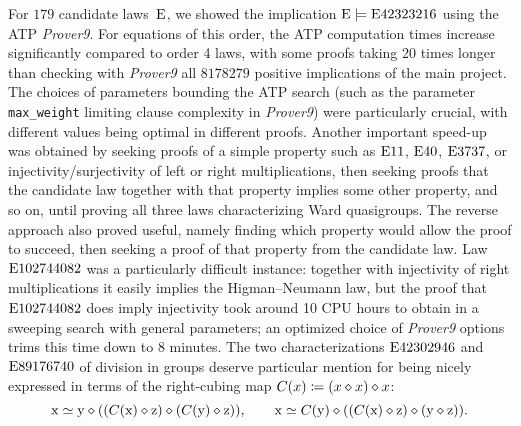 For $179$ candidate laws~$\mathrm{E}$, we showed the implication $\mathrm{E}\models\mathrm{E}42323216$ using the ATP \emph{Prover9}.  For equations of this order, the ATP computation times increase significantly compared to order 4 laws, with some proofs taking 20 times longer than checking with \emph{Prover9} all $\num{8178279}$ positive implications of the main project.  The choices of parameters bounding the ATP search (such as the parameter \texttt{max\_weight} limiting clause complexity in \emph{Prover9}) were particularly crucial, with different values being optimal in different proofs.  Another important speed-up was obtained by seeking proofs of a simple property such as $\mathrm{E}11$, $\mathrm{E}40$, $\mathrm{E}3737$, or injectivity/surjectivity of left or right multiplications, then seeking proofs that the candidate law together with that property implies some other property, and so on, until proving all three laws characterizing Ward quasigroups.  The reverse approach also proved useful, namely finding which property would allow the proof to succeed, then seeking a proof of that property from the candidate law.  Law $\mathrm{E}102744082$ was a particularly difficult instance: together with injectivity of right multiplications it easily implies the Higman--Neumann law, but the proof that $\mathrm{E}102744082$ does imply injectivity took around 10 CPU hours to obtain in a sweeping search with general parameters; an optimized choice of \emph{Prover9} options trims this time down to 8 minutes.  The two characterizations $\mathrm{E}42302946$ and~$\mathrm{E}89176740$ of division in groups deserve particular mention for being nicely expressed in terms of the right-cubing map $C(x) \coloneqq (x \diamond x) \diamond x$:
\[
  \mathrm{x} \simeq \mathrm{y} \diamond ((C(\mathrm{x}) \diamond \mathrm{z}) \diamond (C(\mathrm{y}) \diamond \mathrm{z})) , \qquad
  \mathrm{x} \simeq C(\mathrm{y}) \diamond ((C(\mathrm{x}) \diamond \mathrm{z}) \diamond (\mathrm{y} \diamond \mathrm{z})) .
\]

